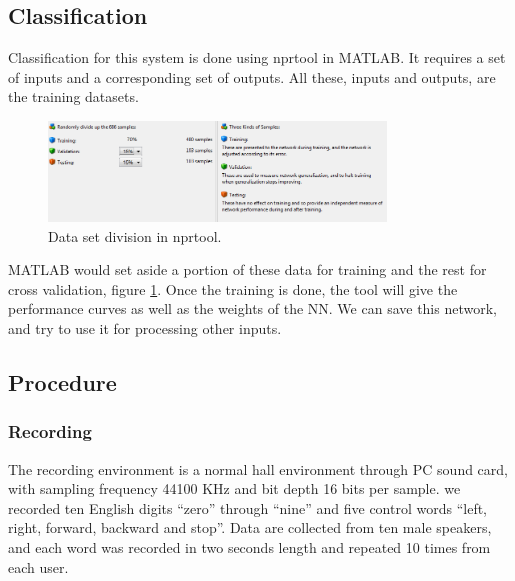 \documentclass[12pt, a4paper, twoside]{report}
\begin{document}
\subsection{Classification}
Classification for this system is done using nprtool in MATLAB. It requires a set of inputs and a corresponding set of outputs. All these, inputs and outputs, are the training datasets.
\begin{figure}[!ht]
	\centering
	\includegraphics[width=0.8\textwidth]
	{images/chapter5/dtw-nprtool}
	\caption{Data set division in nprtool.}
	\label{fig:dtw-nprtool}
\end{figure}

MATLAB would set aside a portion of these data for training and the rest for cross validation, figure \ref{fig:dtw-nprtool}. Once the training is done, the tool will give the performance curves as well as the weights of the NN. We can save this network, and try to use it for processing other inputs.

\subsection{Procedure}
\subsubsection{Recording}
The recording environment is a normal hall environment through PC sound card, with sampling frequency 44100 KHz and bit depth 16 bits per sample. we recorded ten English digits “zero” through “nine” and five control words “left, right, forward, backward and stop”. Data are collected from ten male speakers, and each word was recorded in two seconds length and repeated 10 times from each user.
\end{document}
